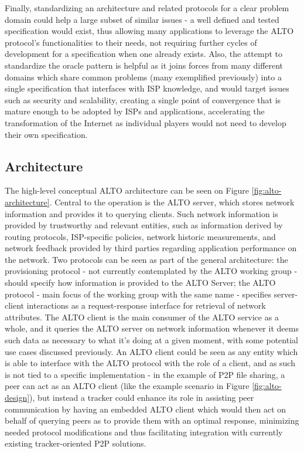     Finally, standardizing an architecture and related protocols for a clear problem domain could help a large subset of similar issues - a well defined and tested specification would exist, thus allowing many applications to leverage the ALTO protocol's functionalities to their needs, not requiring further cycles of development for a specification when one already exists.
        Also, the attempt to standardize the oracle pattern is helpful as it joins forces from many different domains which share common problems (many exemplified previously) into a single specification that interfaces with ISP knowledge, and would target issues such as security and scalability, creating a single point of convergence that is mature enough to be adopted by ISPs and applications, accelerating the transformation of the Internet as individual players would not need to develop their own specification.

\subsection{Architecture}

        The high-level conceptual ALTO architecture can be seen on Figure \ref{fig:alto-architecture}.
        Central to the operation is the ALTO server, which stores network information and provides it to querying clients.
        Such network information is provided by trustworthy and relevant entities, such as information derived by routing protocols, ISP-specific policies, network historic measurements, and network feedback provided by third parties regarding application performance on the network.
        Two protocols can be seen as part of the general architecture: the provisioning protocol - not currently contemplated by the ALTO working group - should specify how information is provided to the ALTO Server; the ALTO protocol - main focus of the working group with the same name - specifies server-client interactions as a request-response interface for retrieval of network attributes.
        The ALTO client is the main consumer of the ALTO service as a whole, and it queries the ALTO server on network information whenever it deems such data as necessary to what it's doing at a given moment, with some potential use cases discussed previously.
        An ALTO client could be seen as any entity which is able to interface with the ALTO protocol with the role of a client, and as such is not tied to a specific implementation - in the example of P2P file sharing, a peer can act as an ALTO client (like the example scenario in Figure \ref{fig:alto-design}), but instead a tracker could enhance its role in assisting peer communication by having an embedded ALTO client which would then act on behalf of querying peers as to provide them with an optimal response, minimizing needed protocol modifications and thus facilitating integration with currently existing tracker-oriented P2P solutions.

